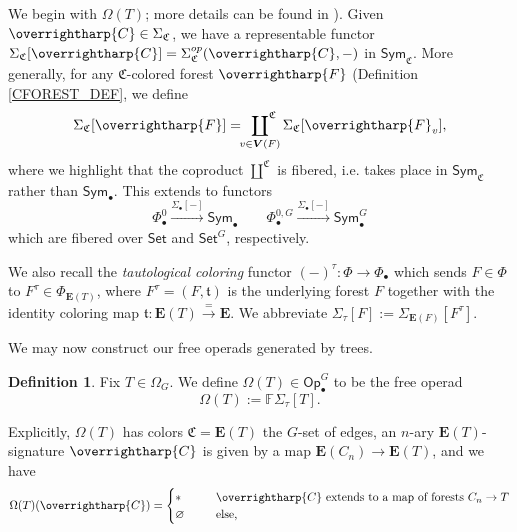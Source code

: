 \documentclass[a4paper,10pt
,draft
]{article}%
\numberwithin{equation}{section}
\numberwithin{figure}{section}
\theoremstyle{definition} %
\newtheorem{definition}[equation]{Definition}%
\newcommand{\vect}[1]{\text{\overrightharp{\ensuremath{#1}}}}
\newcommand{\Sym}{\ensuremath{\mathsf{Sym}}}%
\newcommand{\Set}{\ensuremath{\mathsf{Set}}}
\newcommand{\Op}{\mathsf{Op}}%
\newcommand{\1}{\ensuremath{\mathbbm 1}}%
\begin{document}

We begin with $\Omega(T)$; more details can be found in \cite[\S 2.3.1]{BP_HGOP}). %
Given $\vect C \in \Sigma_{\mathfrak C}$, we have a representable functor $\Sigma_{\mathfrak C}[\vect C] = \Sigma_{\mathfrak C}^{op}(\vect C, -)$ in $\Sym_{\mathfrak C}$.
More generally, for any $\mathfrak C$-colored forest $\vect F$ (Definition \ref{CFOREST_DEF}, we define
\[
      \Sigma_{\mathfrak C}[\vect F] = \sideset{}{^{\mathfrak C}}\coprod_{v \in \boldsymbol{V}(F)} \Sigma_{\mathfrak C}[\vect F_v],
\]
where we highlight that the coproduct $\amalg^{\mathfrak C}$ is fibered, i.e. takes place in $\Sym_{\mathfrak C}$ rather than $\Sym_\bullet$.
This extends to functors
\[
      \Phi_\bullet^0 \xrightarrow{\Sigma_\bullet[-]} \Sym_\bullet
      \qquad
      \Phi_\bullet^{0,G} \xrightarrow{\Sigma_\bullet[-]} \Sym_\bullet^G
\]
which are fibered over $\Set$ and $\Set^G$, respectively.

We also recall the \textit{tautological coloring} functor $(-)^\tau \colon \Phi \to \Phi_{\bullet}$
which sends $F \in \Phi$ to $F^\tau \in \Phi_{\boldsymbol{E}(T)}$,
where $F^\tau = (F,\mathfrak t)$ is the underlying forest $F$ together with the identity coloring map $\mathfrak t \colon \boldsymbol{E}(T) \xrightarrow{=} \boldsymbol{E}$.
We abbreviate $\Sigma_\tau[F] := \Sigma_{\boldsymbol{E}(F)}[F^\tau]$.

We may now construct our free operads generated by trees.

\begin{definition}
      \label{OT_DEF}
      Fix $T \in \Omega_G$.
      We define $\Omega(T) \in \Op_\bullet^G$ to be the free operad
      \[
            \Omega(T) := \mathbb F \Sigma_\tau[T].
      \]
\end{definition}
Explicitly, $\Omega(T)$ has colors $\mathfrak C = \boldsymbol{E}(T)$ the $G$-set of edges,
an $n$-ary $\boldsymbol{E}(T)$-signature $\vect C$ is given by a map $\boldsymbol{E}(C_n) \to \boldsymbol{E}(T)$,
and we have
\begin{equation}
      \label{OMEGADEF_EQ}
      \Omega(T)(\vect C) =
      \begin{cases}
            \** \qquad & \mbox{$\vect C$ extends to a map of forests $C_n \to T$}
            \\
            \varnothing & \text{else,}
      \end{cases}
\end{equation}
\end{document}
